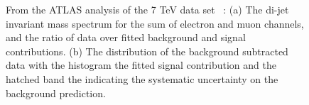 \begin{figure}[th!]
  \begin{center}
   \end{center}
\vspace{-20 pt}
     \caption{From the ATLAS analysis of the 7 TeV data set~\cite{Aad:2014mda}  : (a) The di-jet invariant mass spectrum for the sum of electron and muon channels, and the ratio of data over fitted background and signal contributions. (b) The distribution of the background subtracted data with the histogram the fitted signal contribution and the hatched band the indicating the systematic uncertainty on the background prediction. }
\label{fig:sss-lvjjVVprod-mjj}
\end{figure}


